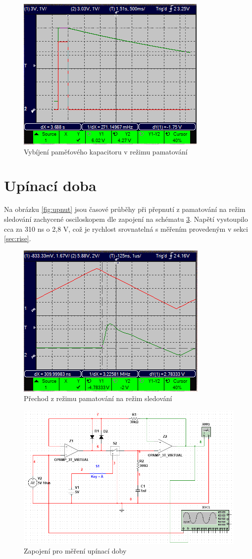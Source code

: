 \documentclass[twoside]{article}
\begin{document}
\begin{figure}[h!]
    \centering
    \includegraphics[width=0.6\linewidth]{vybijeni_pamatovani.png}
    \caption{Vybíjení paměťového kapacitoru v režimu pamatování}
    \label{fig:vybijeni}
\end{figure}

\section{Upínací doba}

Na obrázku \ref{fig:upnut} jsou časové průběhy při přepnutí z pamatování na režim sledování
zachycené osciloskopem dle zapojení na schématu \ref{fig:upnuti_schema}.
Napětí vystoupilo cca za 310 \si{\nano\second} o 2,8 \si{\volt},
což je rychlost srovnatelná s měřením provedeným v sekci \ref{sec:rise}.

\begin{figure}[h!]
    \centering
    \includegraphics[width=0.6\linewidth]{upinaci_doba.png}
    \caption{Přechod z režimu pamatování na režim sledování}
    \label{fig:upnuti}
\end{figure}

\begin{figure}[h!]
    \centering
    \includegraphics[width=0.92\linewidth]{upnuti_schema.png}
    \caption{Zapojení pro měření upínací doby}
    \label{fig:upnuti_schema}
\end{figure}
\end{document}
